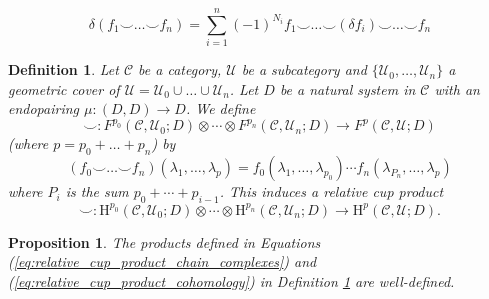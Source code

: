 \documentclass[10pt,a4paper]{amsart}
\newtheorem{defi}{Definition}
\newtheorem{prop}{Proposition}
\newcommand{\CC}{\mathcal{C}}
\newcommand{\Ho}{\mathrm{H}}
\newcommand{\Uc}{\mathcal{U}}
\newcommand{\co}{\colon}
\begin{document}
\begin{equation}\label{Product_Induction}
    \delta(f_1 \smile \dots \smile f_n)= \sum_{i=1}^{n} (-1)^{N_i} f_1 \smile \dots \smile (\delta f_i) \smile \dots \smile f_n
\end{equation}

\begin{defi}\label{defi:cup_product_relative}
    Let $\CC$ be a category, $\Uc$ be a subcategory and $\{\Uc_0, \dots, \Uc_n\}$ a geometric cover of $\Uc=\Uc_0 \cup \ldots \cup \Uc_n$. Let $D$ be a natural system in $\CC$ with an endopairing $\mu \colon (D,D) \rightarrow D$. We define \begin{equation}\label{eq:relative_cup_product_chain_complexes}
    \smile\co F^{p_0}(\CC,\Uc_0;D) \otimes \cdots \otimes F^{p_n}(\CC,\Uc_n;D) \rightarrow F^{p}(\CC,\Uc;D)
    \end{equation}
    (where $p=p_0+\dots+p_n$) by $$(f_0 \smile \dots \smile f_n)(\lambda_1,\dots,\lambda_{p})=f_0(\lambda_1,\dots,\lambda_{p_{0}}) \cdots f_n(\lambda_{P_{n}},\dots,\lambda_{p})$$
    where $P_{i}$ is the sum $p_0+\cdots + p_{i-1}$.
    This induces a \emph{relative cup product}
\begin{equation}\label{eq:relative_cup_product_cohomology}
        \smile\co \Ho^{p_0}(\CC,\Uc_0;D) \otimes \cdots \otimes \Ho^{p_n}(\CC,\Uc_n;D) \rightarrow \Ho^{p}(\CC,\Uc;D).
    \end{equation}  
\end{defi}

\begin{prop}\label{rel-cup}\label{VARIOS}
    The products defined in Equations (\ref{eq:relative_cup_product_chain_complexes}) and (\ref{eq:relative_cup_product_cohomology}) in Definition \ref{defi:cup_product_relative} are well-defined. 
\end{prop}
\end{document}
